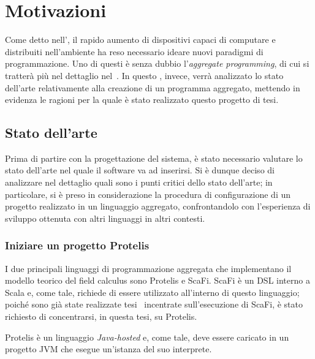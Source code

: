 \chapter{Motivazioni}\label{ch:motivations}
  Come detto nell', il rapido aumento di dispositivi capaci di computare e distribuiti nell'ambiente ha reso necessario ideare nuovi paradigmi di programmazione.
  Uno di questi è senza dubbio l'\emph{aggregate programming}, di cui si tratterà più nel dettaglio nel~.
  In questo , invece, verrà analizzato lo stato dell'arte relativamente alla creazione di un programma aggregato,
  mettendo in evidenza le ragioni per la quale è stato realizzato questo progetto di tesi.

  \section{Stato dell'arte}\label{sec:state-of-art}

  Prima di partire con la progettazione del sistema, è stato necessario valutare lo stato dell'arte nel quale il software va ad inserirsi.
  Si è dunque deciso di analizzare nel dettaglio quali sono i punti critici dello stato dell'arte;
  in particolare, si è preso in considerazione la procedura di configurazione di un progetto realizzato in un linguaggio aggregato,
  confrontandolo con l'esperienza di sviluppo ottenuta con altri linguaggi in altri contesti.

  \subsection{Iniziare un progetto Protelis}\label{subsec:setup}

  I due principali linguaggi di programmazione aggregata che implementano il modello teorico del field calculus sono Protelis e ScaFi.
  ScaFi è un DSL interno a Scala e, come tale, richiede di essere utilizzato all'interno di questo linguaggio;
  poiché sono già state realizzate tesi~\cite{amslaurea12188,amslaurea16824} incentrate sull'esecuzione di ScaFi, è stato richiesto di concentrarsi, in questa tesi, su Protelis.

  Protelis è un linguaggio \emph{Java-hosted} e, come tale, deve essere caricato in un progetto JVM che esegue un'istanza del suo interprete.

